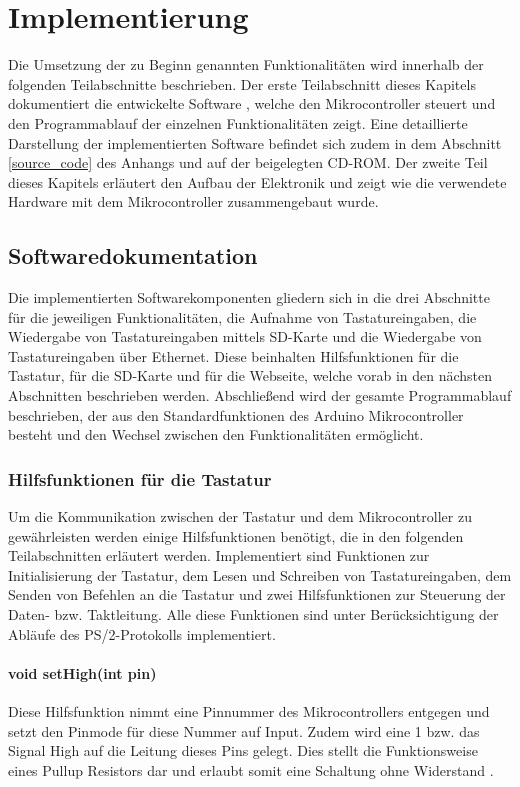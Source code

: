 \chapter{Implementierung}
\label{implementierung}
Die Umsetzung der zu Beginn genannten Funktionalitäten wird innerhalb der folgenden Teilabschnitte beschrieben. Der erste Teilabschnitt dieses Kapitels dokumentiert die entwickelte Software \cite{badps2}, welche den Mikrocontroller steuert und den Programmablauf der einzelnen Funktionalitäten zeigt. Eine detaillierte Darstellung der implementierten Software befindet sich zudem in dem Abschnitt \ref{source_code} des Anhangs und auf der beigelegten CD-ROM. Der zweite Teil dieses Kapitels erläutert den Aufbau der Elektronik und zeigt wie die verwendete Hardware mit dem Mikrocontroller zusammengebaut wurde.



\section{Softwaredokumentation}
Die implementierten Softwarekomponenten \cite{badps2} gliedern sich in die drei Abschnitte für die jeweiligen Funktionalitäten, die Aufnahme von Tastatureingaben, die Wiedergabe von Tastatureingaben mittels SD-Karte und die Wiedergabe von Tastatureingaben über Ethernet. Diese beinhalten Hilfsfunktionen für die Tastatur, für die SD-Karte und für die Webseite, welche vorab in den nächsten Abschnitten beschrieben werden. Abschließend wird der gesamte Programmablauf beschrieben, der aus den Standardfunktionen des Arduino Mikrocontroller besteht und den Wechsel zwischen den Funktionalitäten ermöglicht.



\subsection{Hilfsfunktionen für die Tastatur}
Um die Kommunikation zwischen der Tastatur und dem Mikrocontroller zu gewährleisten werden einige Hilfsfunktionen benötigt, die in den folgenden Teilabschnitten erläutert werden. Implementiert sind Funktionen zur Initialisierung der Tastatur, dem Lesen und Schreiben von Tastatureingaben, dem Senden von Befehlen an die Tastatur und zwei Hilfsfunktionen zur Steuerung der Daten- bzw. Taktleitung. Alle diese Funktionen sind unter Berücksichtigung der Abläufe des PS/2-Protokolls implementiert.

\subsubsection{void setHigh(int pin)}
Diese Hilfsfunktion nimmt eine Pinnummer des Mikrocontrollers entgegen und setzt den Pinmode für diese Nummer auf Input. Zudem wird eine 1 bzw. das Signal High auf die Leitung dieses Pins gelegt. Dies stellt die Funktionsweise eines Pullup Resistors dar und erlaubt somit eine Schaltung ohne Widerstand \cite{arduino_pullup}.

